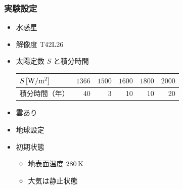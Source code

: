\documentclass[aspectratio=149,9pt,fleqn]{beamer}
\begin{document}
\begin{frame}
	\frametitle{実験設定}
	\begin{itemize}
		\item 水惑星
		\item 解像度 T42L26
		\item 太陽定数 \(S\) と積分時間
			\begin{table}
				\begin{tabular}{lrrrrr}
					\hline
					\(S\hmu{[W/m^2]}\)&\(1366\)&\(1500\)&\(1600\)&\(1800\)&\(2000\)\\
					\hline
					積分時間（年）&40&3&10&10&20\\
					\hline
				\end{tabular}
			\end{table}
		\item 雲あり
		\item 地球設定
		\item 初期状態
			\begin{itemize}
				\item 地表面温度 \(280\hmu{K}\)
				\item 大気は静止状態
			\end{itemize}
	\end{itemize}
\end{frame}
\end{document}
